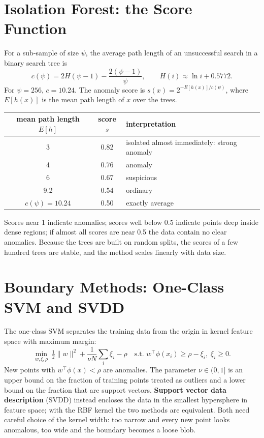 \documentclass[11pt]{article}
\begin{document}
\section{Isolation Forest: the Score Function}
For a sub-sample of size $\psi$, the average path length of an unsuccessful search in a binary search tree is
\[c(\psi)=2H(\psi-1)-\frac{2(\psi-1)}{\psi},\qquad H(i)\approx\ln i+0.5772.\]
For $\psi=256$, $c=10.24$. The anomaly score is $s(x)=2^{-E[h(x)]/c(\psi)}$, where $E[h(x)]$ is the mean path length of $x$ over the trees.
\begin{center}\small\begin{tabular}{ccl}\toprule mean path length $E[h]$ & score $s$ & interpretation\\\midrule 3 & 0.82 & isolated almost immediately: strong anomaly\\ 4 & 0.76 & anomaly\\ 6 & 0.67 & suspicious\\ 9.2 & 0.54 & ordinary\\ $c(\psi)=10.24$ & 0.50 & exactly average\\\bottomrule\end{tabular}\end{center}
Scores near 1 indicate anomalies; scores well below 0.5 indicate points deep inside dense regions; if almost all scores are near 0.5 the data contain no clear anomalies. Because the trees are built on random splits, the scores of a few hundred trees are stable, and the method scales linearly with data size.

\section{Boundary Methods: One-Class SVM and SVDD}
The one-class SVM separates the training data from the origin in kernel feature space with maximum margin:
\[\min_{w,\xi,\rho}\;\tfrac12\|w\|^2+\frac1{\nu N}\sum_i\xi_i-\rho\quad\text{s.t. }w^\top\phi(x_i)\ge\rho-\xi_i,\;\xi_i\ge0.\]
New points with $w^\top\phi(x)<\rho$ are anomalies. The parameter $\nu\in(0,1]$ is an upper bound on the fraction of training points treated as outliers and a lower bound on the fraction that are support vectors. \textbf{Support vector data description} (SVDD) instead encloses the data in the smallest hypersphere in feature space; with the RBF kernel the two methods are equivalent. Both need careful choice of the kernel width: too narrow and every new point looks anomalous, too wide and the boundary becomes a loose blob.
\end{document}
